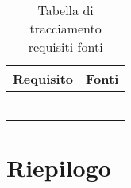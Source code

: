 \documentclass[AnalisiDeiRequisiti.tex]{subfiles}
\begin{document}
\label{table:Tabella di tracciamento requisiti-fonti}
\begin{longtable}[H]{|p{5cm}|p{8cm}|}
	\hline
	\rowcolor[HTML]{38FFF8} 
	\textbf{Requisito} & \textbf{Fonti} \\ \hline
	\endhead
	&  \\ \hline
	&  \\ \hline
	&  \\ \hline
	&  \\ \hline
	&  \\ \hline
	\caption{Tabella di tracciamento requisiti-fonti}
\end{longtable}

\section{Riepilogo}
\end{document}
